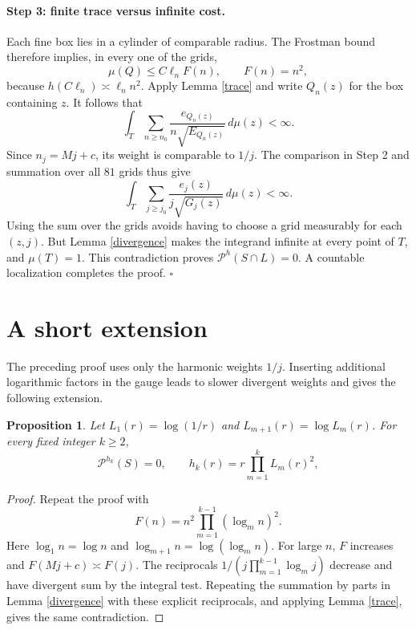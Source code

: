 \documentclass[11pt]{article}
\newtheorem{proposition}[theorem]{Proposition}
\begin{document}
\paragraph{Step 3: finite trace versus infinite cost.}
Each fine box lies in a cylinder of comparable radius. The Frostman
bound therefore implies, in every one of the grids,
$$
\mu(Q)\leq C\ell_nF(n),\qquad F(n)=n^2,
$$
because \(h(C\ell_n)\asymp\ell_n n^2\).
Apply Lemma \ref{trace} and write \(Q_n(z)\) for the box containing
\(z\). It follows that
$$
\int_T\sum_{n\geq n_0}
 \frac{e_{Q_n(z)}}{n\sqrt{E_{Q_n(z)}}}\,d\mu(z)<\infty.
$$
Since \(n_j=Mj+c\), its weight is comparable to \(1/j\).
The comparison in Step 2 and summation over all \(81\) grids thus give
$$
\int_T\sum_{j\geq j_0}
 \frac{e_j(z)}{j\sqrt{G_j(z)}}\,d\mu(z)<\infty.
$$
Using the sum over the grids avoids having to choose a grid measurably
for each \((z,j)\). But Lemma \ref{divergence} makes the integrand
infinite at every point of \(T\), and \(\mu(T)=1\). This contradiction
proves \(\mathcal P^h(S\cap L)=0\). A countable localization completes
the proof. \hfill\(\square\)

\section{A short extension}

The preceding proof uses only the harmonic weights \(1/j\).
Inserting additional logarithmic factors in the gauge leads to
slower divergent weights and gives the following extension.

\begin{proposition}\label{iterated}
Let \(L_1(r)=\log(1/r)\) and
\(L_{m+1}(r)=\log L_m(r)\).
For every fixed integer \(k\geq2\),
$$
\mathcal P^{h_k}(S)=0,
\qquad h_k(r)=r\prod_{m=1}^kL_m(r)^2,
$$
\end{proposition}

\begin{proof}
Repeat the proof with
$$
F(n)=n^2\prod_{m=1}^{k-1}(\log_m n)^2.
$$
Here \(\log_1 n=\log n\) and \(\log_{m+1}n=\log(\log_m n)\).
For large \(n\), \(F\) increases and \(F(Mj+c)\asymp F(j)\).
The reciprocals \(1/(j\prod_{m=1}^{k-1}\log_m j)\) decrease
and have divergent sum by the integral test. Repeating the
summation by parts in Lemma \ref{divergence} with these explicit
reciprocals, and applying Lemma \ref{trace}, gives the same contradiction.
\end{proof}
\end{document}
